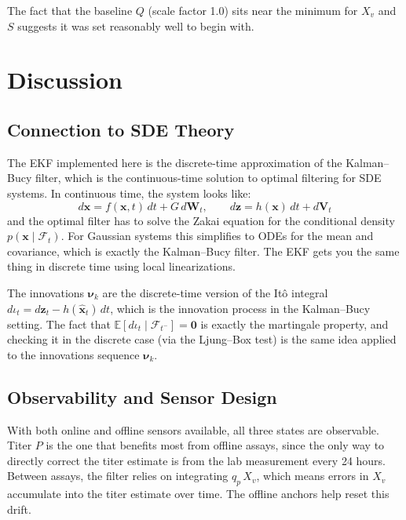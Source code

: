 \documentclass[11pt,letterpaper]{article}
\newcommand{\xv}{X_{v}}
\newcommand{\qp}{q_{p}}
\newcommand{\bx}{\mathbf{x}}
\newcommand{\bz}{\mathbf{z}}
\newcommand{\Filt}{\mathcal{F}}
\begin{document}
The fact that the baseline $Q$ (scale factor 1.0) sits near the minimum for $\xv$ and $S$
suggests it was set reasonably well to begin with.

\section{Discussion}
\label{sec:discussion}

\subsection{Connection to SDE Theory}

The EKF implemented here is the discrete-time approximation of the Kalman--Bucy filter, which
is the continuous-time solution to optimal filtering for SDE systems. In continuous time, the
system looks like:
\begin{equation}
    d\bx = f(\bx,t)\,dt + G\,d\mathbf{W}_t, \qquad
    d\bz = h(\bx)\,dt + d\mathbf{V}_t
\end{equation}
and the optimal filter has to solve the Zakai equation for the conditional density
$p(\bx \mid \Filt_t)$. For Gaussian systems this simplifies to ODEs for the mean and covariance,
which is exactly the Kalman--Bucy filter. The EKF gets you the same thing in discrete time
using local linearizations.

The innovations $\boldsymbol{\nu}_k$ are the discrete-time version of the It\^{o} integral
$d\iota_t = d\bz_t - h(\hat{\bx}_t)\,dt$, which is the innovation process in the Kalman--Bucy
setting. The fact that $\mathbb{E}[d\iota_t \mid \Filt_{t^-}] = \mathbf{0}$ is exactly the
martingale property, and checking it in the discrete case (via the Ljung--Box test) is the
same idea applied to the innovations sequence $\boldsymbol{\nu}_k$.

\subsection{Observability and Sensor Design}

With both online and offline sensors available, all three states are observable. Titer $P$
is the one that benefits most from offline assays, since the only way to directly correct
the titer estimate is from the lab measurement every 24 hours. Between assays, the filter
relies on integrating $\qp\,\xv$, which means errors in $\xv$ accumulate into the titer
estimate over time. The offline anchors help reset this drift.
\end{document}
